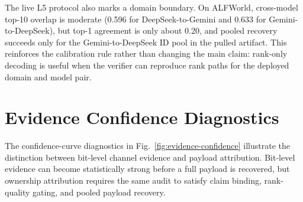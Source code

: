 \documentclass[conference,compsoc]{IEEEtran}
\begin{document}
The live L5 protocol also marks a domain boundary. On ALFWorld, cross-model top-10 overlap is moderate (0.596 for DeepSeek-to-Gemini and 0.633 for Gemini-to-DeepSeek), but top-1 agreement is only about 0.20, and pooled recovery succeeds only for the Gemini-to-DeepSeek ID pool in the pulled artifact. This reinforces the calibration rule rather than changing the main claim: rank-only decoding is useful when the verifier can reproduce rank paths for the deployed domain and model pair.

\section{Evidence Confidence Diagnostics}
\label{app:evidence-diagnostics}

The confidence-curve diagnostics in Fig.~\ref{fig:evidence-confidence} illustrate the distinction between bit-level channel evidence and payload attribution. Bit-level evidence can become statistically strong before a full payload is recovered, but ownership attribution requires the same audit to satisfy claim binding, rank-quality gating, and pooled payload recovery.
\end{document}

